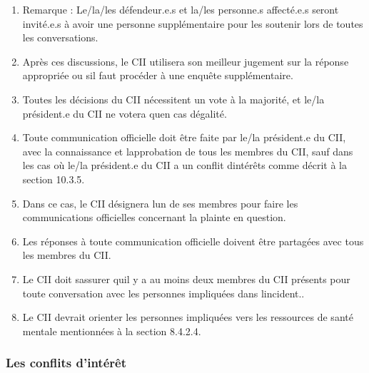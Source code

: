 \begin{enumerate}
  \begin{enumerate}
   \item
    Le/les défendeur.e.s
   \item
    La/les personne.s affectée.s
   \item
    La personne ayant fait le signalement, le cas échéant
   \item
    Tout témoin(s) de l\textquotesingle incident, si absolument nécessaire
  \end{enumerate}
 \item
  Remarque : Le/la/les défendeur.e.s et la/les personne.s affecté.e.s seront invité.e.s à avoir une personne supplémentaire pour les soutenir lors de toutes les conversations.
 \item
  Après ces discussions, le CII utilisera son meilleur jugement sur la réponse appropriée ou s\textquotesingle il faut procéder à une enquête supplémentaire.
 \item
  Toutes les décisions du CII nécessitent un vote à la majorité, et le/la président.e du CII ne votera qu\textquotesingle en cas d\textquotesingle égalité.
 \item
  Toute communication officielle doit être faite par le/la président.e du CII, avec la connaissance et l\textquotesingle approbation de tous les membres du CII, sauf dans les cas où le/la président.e du CII a un conflit d\textquotesingle intérêts comme décrit à la section 10.3.5.
 \item
  Dans ce cas, le CII désignera l\textquotesingle un de ses membres pour faire les communications officielles concernant la plainte en question.
 \item
  Les réponses à toute communication officielle doivent être partagées avec tous les membres du CII.
 \item
  Le CII doit s\textquotesingle assurer qu\textquotesingle il y a au moins deux membres du CII présents pour toute conversation avec les personnes impliquées dans l\textquotesingle incident..
 \item
  Le CII devrait orienter les personnes impliquées vers les ressources de santé mentale mentionnées à la section 8.4.2.4.
\end{enumerate}

\subsubsection{Les conflits d'intérêt}
\label{les-conflits-d-interet}

